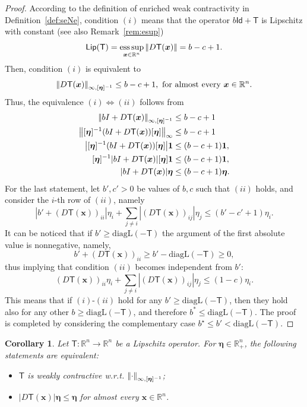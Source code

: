 \documentclass[journal,twoside,web]{ieeecolor}
\DeclareMathOperator*{\esup}{ess\,sup}
\newcommand{\abs}[1]{{\left\vert #1 \right\vert}}
\newcommand{\norm}[1]{{\left\vert\kern-0.25ex\left\vert #1\right\vert\kern-0.25ex\right\vert}}
\newcommand{\rea }{\mathbb{R}}
\newcommand{\xb}{\boldsymbol{x}}
\newcommand{\etab}{\boldsymbol{\eta}}
\newcommand{\Ts}{\mathsf{T}}
\newcommand{\Is}{\mathsf{Id}}
\newcommand{\bone}{\boldsymbol{1}}
\newcommand{\Lip}{\mathsf{Lip}}
\newtheorem{cor}{Corollary}
\begin{document}
\begin{proof}
    According to the definition of enriched weak contractivity in Definition~\ref{def:seNe}, condition $(i)$ means that the operator $b\Is + \Ts$ is Lipschitz with constant (see also Remark~\ref{rem:esup})
    $$
    \Lip(\Ts) = \esup_{\xb\in\rea^n} \norm{D\Ts(\xb)} = b-c+1.
    $$
    Then, condition $(i)$ is equivalent to
    \begin{equation}\label{eq:suplip}
        \norm{D\Ts(\xb)}_{\infty,[\etab]^{-1}} \leq b-c+1, \text{ for almost every }  \xb\in\rea^n.
    \end{equation}
    Thus, the equivalence $(i)\Leftrightarrow (ii)$ follows from 
    $$
    \begin{aligned}
        \norm{bI + D\Ts(\xb)}_{\infty,[\etab]^{-1}} &\leq b-c+1\\
        \norm{[\etab]^{-1}(bI + D\Ts(\xb))[\etab]}_{\infty} &\leq b-c+1\\
        \abs{[\etab]^{-1}(bI +D\Ts(\xb))[\etab]}\bone &\leq (b-c+1)\bone,\\
        [\etab]^{-1}\abs{bI + D\Ts(\xb)}[\etab]\bone &\leq (b-c+1)\bone,\\
        \abs{bI + D\Ts(\xb)}\etab &\leq (b-c+1)\etab.
    \end{aligned}
    $$
    For the last statement, let $b',c'>0$ be values of $b,c$ such that $(ii)$ holds, and consider the $i$-th row of $(ii)$, namely
    $$
    \abs{b' + (D\Ts(\xb))_{ii}}\eta_i + \sum_{j\neq i}\abs{(D\Ts(\xb))_{ij}}\eta_j \leq (b'-c'+1)\eta_i.
    $$
    It can be noticed that if $b'\geq \text{diagL}(-\Ts)$ the argument of the first absolute value is nonnegative, namely,
    $$
    b'+(D\Ts(\xb))_{ii}\geq b' - \text{diagL}(-\Ts) \geq 0,
    $$
    thus implying that condition $(ii)$ becomes independent from $b'$:
    $$
    (D\Ts(\xb))_{ii}\eta_i + \sum_{j\neq i}\abs{(D\Ts(\xb))_{ij}}\eta_j \leq (1-c)\eta_i.
    $$
    This means that if $(i)$-$(ii)$ hold for any $b'\geq \text{diagL}(-\Ts)$, then they hold also for any other $b\geq \text{diagL}(-\Ts)$, and therefore $b^* \leq \text{diagL}(-\Ts)$. The proof is completed by considering the complementary case $b^\star \leq b'< \text{diagL}(-\Ts)$.
\end{proof}
%
\begin{cor}\label{cor:inf-conex}
%
Let $\Ts:\rea^n\rightarrow\rea^n$ be a Lipschitz operator.
%
For $\etab\in\rea^n_+$, the following statements are equivalent:
%
\begin{itemize}
    \item[(i)] $\Ts$ is weakly contractive w.r.t. $\norm{\cdot}_{\infty,[\etab]^{-1}}$;
    \item[(ii)] $\abs{D\Ts(\xb)}\etab \leq \etab$ for almost every $\xb\in\rea^n$.
\end{itemize}
%
\end{cor}
\end{document}
